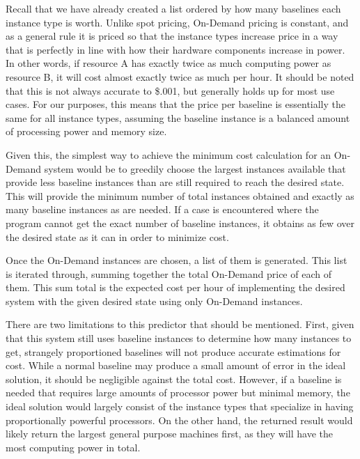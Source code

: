 \documentclass[thesis,proposal]{umassthesis}  %
\begin{document}
Recall that we have already created a list ordered by how many baselines each instance type is worth. Unlike spot pricing, On-Demand pricing is constant, and as a general rule it is priced so that the instance types increase price in a way that is perfectly in line with how their hardware components increase in power. In other words, if resource A has exactly twice as much computing power as resource B, it will cost almost exactly twice as much per hour. It should be noted that this is not always accurate to \$.001, but generally holds up for most use cases\cite{amazonEC2Pricing}. For our purposes, this means that the price per baseline is essentially the same for all instance types, assuming the baseline instance is a balanced amount of processing power and memory size.\par

Given this, the simplest way to achieve the minimum cost calculation for an On-Demand system would be to greedily choose the largest instances available that provide less baseline instances than are still required to reach the desired state. This will provide the minimum number of total instances obtained and exactly as many baseline instances as are needed. If a case is encountered where the program cannot get the exact number of baseline instances, it obtains as few over the desired state as it can in order to minimize cost.\par

Once the On-Demand instances are chosen, a list of them is generated. This list is iterated through, summing together the total On-Demand price of each of them. This sum total is the expected cost per hour of implementing the desired system with the given desired state using only On-Demand instances.\par

There are two limitations to this predictor that should be mentioned. First, given that this system still uses baseline instances to determine how many instances to get, strangely proportioned baselines will not produce accurate estimations for cost. While a normal baseline may produce a small amount of error in the ideal solution, it should be negligible against the total cost. However, if a baseline is needed that requires large amounts of processor power but minimal memory, the ideal solution would largely consist of the instance types that specialize in having proportionally powerful processors. On the other hand, the returned result would likely return the largest general purpose machines first, as they will have the most computing power in total.\par
\end{document}

